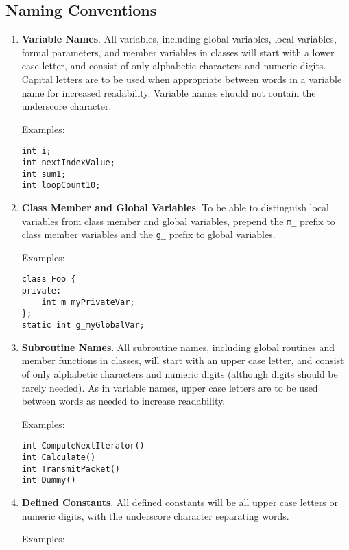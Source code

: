 \documentclass[11pt]{article}
\newcommand{\code}[1]{\texttt{#1}}
\begin{document}
\subsection{Naming Conventions}
\begin{enumerate}
\item {\bf Variable Names}.  All variables, including global variables,
local variables, formal parameters, 
and member variables in classes will start with a
lower case letter, and consist of only alphabetic characters and numeric
digits.  Capital letters are to be used when appropriate between words
in a variable name for increased readability.  
Variable names should not contain the underscore character.

Examples:

{\tt int i;}\\
{\tt int nextIndexValue;}\\
{\tt int sum1;}\\
{\tt int loopCount10;}

\item {\bf Class Member and Global Variables}. To be able to distinguish 
local variables from class member and global variables, prepend the
\code{m\_} prefix to class member variables and the \code{g\_} prefix
to global variables.

Examples:
\begin{verbatim}
class Foo {
private:
    int m_myPrivateVar;
};
static int g_myGlobalVar;
\end{verbatim}

\item {\bf Subroutine Names}.  All subroutine names, including global
routines and member functions in classes, will start with an upper case
letter, and consist of only alphabetic characters and numeric digits
(although digits should be rarely needed).
As in variable names, upper case letters are to be used between words as needed
to increase readability.

Examples:

{\tt int ComputeNextIterator()}\\
{\tt int Calculate()}\\
{\tt int TransmitPacket()}\\
{\tt int Dummy()}

\item {\bf Defined Constants}.  All defined constants will be all upper
case letters or numeric digits, with the underscore character separating
words.  

Examples:


\end{enumerate}
\end{document}
